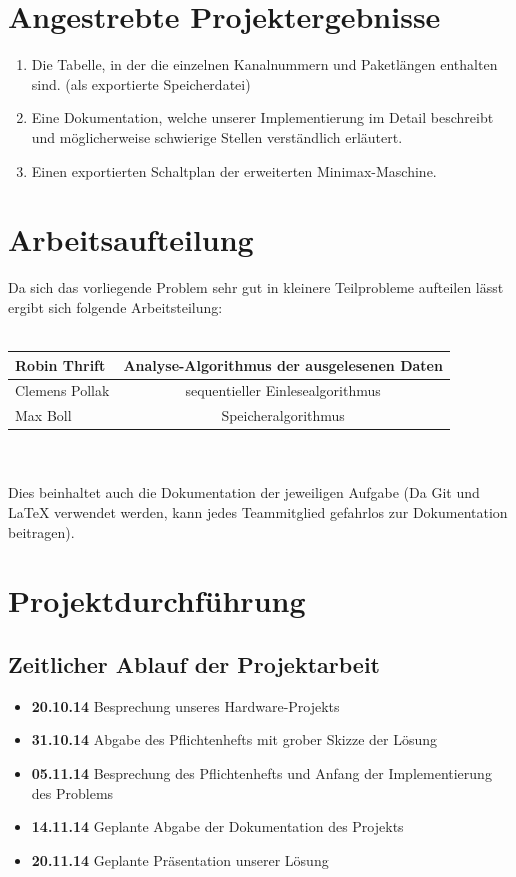 \documentclass[12pt,titlepage]{article}
\begin{document}
\newpage

\section{Angestrebte Projektergebnisse}
\begin{enumerate}
\item Die Tabelle, in der die einzelnen Kanalnummern und Paketl{\"a}ngen enthalten sind. (als exportierte Speicherdatei)
\item Eine Dokumentation, welche unserer Implementierung im Detail beschreibt und m{\"o}glicherweise schwierige Stellen verst{\"a}ndlich erl{\"a}utert.
\item Einen exportierten Schaltplan der erweiterten Minimax-Maschine.
\end{enumerate}

\section{Arbeitsaufteilung}
Da sich das vorliegende Problem sehr gut in kleinere Teilprobleme aufteilen lässt ergibt sich folgende 
Arbeitsteilung:
\leavevmode \\
\\
\begin{tabular}{|l|c|}
\hline
Robin Thrift &  Analyse-Algorithmus der ausgelesenen Daten \\
\hline
Clemens Pollak & sequentieller Einlesealgorithmus \\
\hline
Max Boll & Speicheralgorithmus \\
\hline
\end{tabular}
\leavevmode \\
\\
Dies beinhaltet auch die Dokumentation der jeweiligen Aufgabe (Da Git und LaTeX verwendet werden, kann jedes 
Teammitglied gefahrlos zur Dokumentation beitragen).


\section{Projektdurchf{\"u}hrung}

\subsection{Zeitlicher Ablauf der Projektarbeit}

\begin{itemize}
\item [] \textbf{20.10.14} Besprechung unseres Hardware-Projekts
\item [] \textbf{31.10.14} Abgabe des Pflichtenhefts mit grober Skizze der L{\"o}sung
\item [] \textbf{05.11.14} Besprechung des Pflichtenhefts und Anfang der Implementierung des Problems
\item [] \textbf{14.11.14} Geplante Abgabe der Dokumentation des Projekts
\item [] \textbf{20.11.14} Geplante Pr{\"a}sentation unserer Lösung
\end{itemize}
\end{document}
